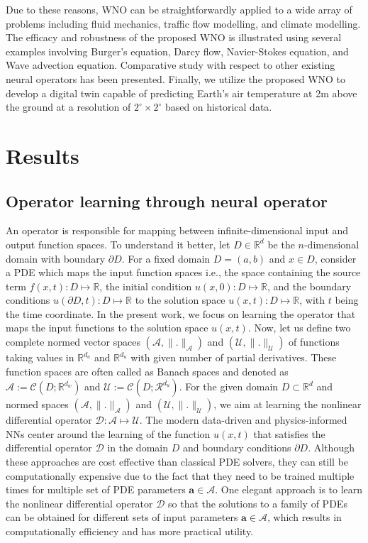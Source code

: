 \documentclass{article}
\begin{document}
Due to these reasons, WNO can be straightforwardly applied to a wide array of problems including fluid mechanics, traffic flow modelling, and climate modelling. The efficacy and robustness of the proposed WNO is illustrated using several examples involving Burger's equation, Darcy flow, Navier-Stokes equation, and Wave advection equation. Comparative study with respect to other existing neural operators has been presented. Finally, we utilize the proposed WNO to develop a digital twin capable of predicting Earth's air temperature at 2m above the ground at a resolution of $2^\circ \times 2^\circ$ based on historical data.



\section*{Results}
\subsection*{Operator learning through neural operator}\label{sec:methods}
An operator is responsible for mapping between infinite-dimensional input and output function spaces. To understand it better, let $D \in \mathbb{R}^{d}$ be the $n$-dimensional domain with boundary $\partial D$. For a fixed domain $D=(a,b)$ and $x \in D$, consider a PDE which maps the input function spaces i.e., the space containing the source term $f(x, t) : D \mapsto \mathbb{R}$, the initial condition $u(x,0) : D \mapsto \mathbb{R}$, and the boundary conditions $u(\partial D, t) : D \mapsto \mathbb{R}$ to the solution space $u(x, t) : D \mapsto \mathbb{R}$, with $t$ being the time coordinate.
In the present work, we focus on learning the operator that maps the input functions to the solution space $u(x,t)$. Now, let us define two complete normed vector spaces $(\mathcal{A}, \|.\|_{\mathcal{A}})$ and $(\mathcal{U}, \|.\|_{\mathcal{U}})$ of functions taking values in $\mathbb{R}^{d_a}$ and $\mathbb{R}^{d_u}$ with given number of partial derivatives. 
These function spaces are often called as Banach spaces and denoted as $\mathcal{A}:= \mathcal{C}(D;\mathbb{R}^{d_w})$ and $\mathcal{U}:= \mathcal{C}(D;\mathcal{R}^{d_u})$. For the given domain $D \subset \mathbb{R}^{d}$ and normed spaces $(\mathcal{A}, \|.\|_{\mathcal{A}})$ and $(\mathcal{U}, \|.\|_{\mathcal{U}})$, we aim at learning the nonlinear differential operator $\mathcal{D}: \mathcal{A} \mapsto \mathcal{U}$. 
The modern data-driven and physics-informed NNs center around the learning of the function $u(x, t)$ that satisfies the differential operator $\mathcal{D}$ in the domain $D$ and boundary conditions $\partial D$. Although these approaches are cost effective than classical PDE solvers, they can still be computationally expensive due to the fact that they need to be trained multiple times for multiple set of PDE parameters ${\bm{a}} \in \mathcal{A}$. One elegant approach is to learn the nonlinear differential operator $\mathcal{D}$ so that the solutions to a family of PDEs can be obtained for different sets of input parameters ${\bm{a}} \in \mathcal{A}$, which results in computationally efficiency and has more practical utility. 
\end{document}
